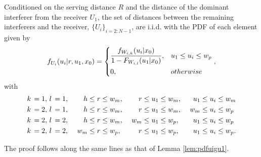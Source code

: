 \documentclass[journal,draftclsnofoot,onecolumn,12pt]{IEEEtran}
\begin{document}
\begin{lemma}\label{lem:pdfui}
Conditioned on the serving distance $R$ and the distance of the dominant interferer from the receiver $U_1$, the set of distances between the remaining interferers and the receiver, $\{U_i\}_{i=2:N-1}$, are i.i.d. with the PDF of each element given by
\begin{align}
f_{U_i}(u_i | r, u_1, x_0) = 
\begin{dcases}
\frac{f_{W_{i,k}}(u_i|x_0)}{1-F_{W_{i,l}}(u_1|x_0)}, & u_1 \leq u_i \leq w_p \\
0,   & otherwise
\end{dcases},
\end{align}
with 
\begin{alignat*}{5}\notag
k\, = 1, \, l\, = 1,&& \   h &\leq r \leq w_m,\  &r &\leq  u_1 \leq w_m,\  &u_1 &\leq  u_i \leq w_m \\ \notag
k\, = 2, \, l\, = 1,&& \   h &\leq r \leq w_m,\  &r &\leq  u_1 \leq w_m,\  &w_m &\leq  u_i \leq w_p \\ \notag
k\, = 2, \, l\, = 2,&& \   h &\leq r \leq w_m,\ &w_m &\leq  u_1 \leq w_p,\  &u_1 &\leq  u_i \leq w_p \\ \notag
k\, = 2, \, l\, = 2,&& \   w_m &\leq r \leq w_p,\  &r &\leq  u_1 \leq w_p,\  &u_1 &\leq  u_i \leq w_p . 
\end{alignat*}
\normalsize
\end{lemma}
\begin{IEEEproof} 
The proof follows along the same lines as that of Lemma \ref{lem:pdfuigu1}.
\end{IEEEproof}
\end{document}
